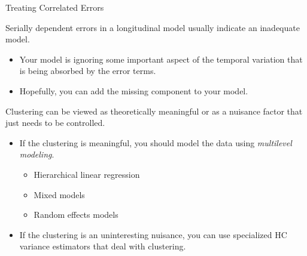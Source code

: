 \documentclass{beamer}\usepackage[]{graphicx}\usepackage[]{color}
\begin{document}
\begin{frame}[allowframebreaks]{Treating Correlated Errors}
  
  Serially dependent errors in a longitudinal model usually indicate an 
  inadequate model.
  \vc
  \begin{itemize}
  \item Your model is ignoring some important aspect of the temporal variation 
    that is being absorbed by the error terms.
    \vc
  \item Hopefully, you can add the missing component to your model.
  \end{itemize}
  
  \pagebreak
  
  Clustering can be viewed as theoretically meaningful or as a nuisance factor 
  that just needs to be controlled.
  \vb
  \begin{itemize}
  \item If the clustering is meaningful, you should model the data using 
    \emph{multilevel modeling}.
    \vc
    \begin{itemize}
    \item Hierarchical linear regression
      \vc
    \item Mixed models
      \vc
    \item Random effects models
    \end{itemize}
    \vc
  \item If the clustering is an uninteresting nuisance, you can use specialized 
    HC variance estimators that deal with clustering.
  \end{itemize}
  
\end{frame}
  
\watermarkoff %
\end{document}
